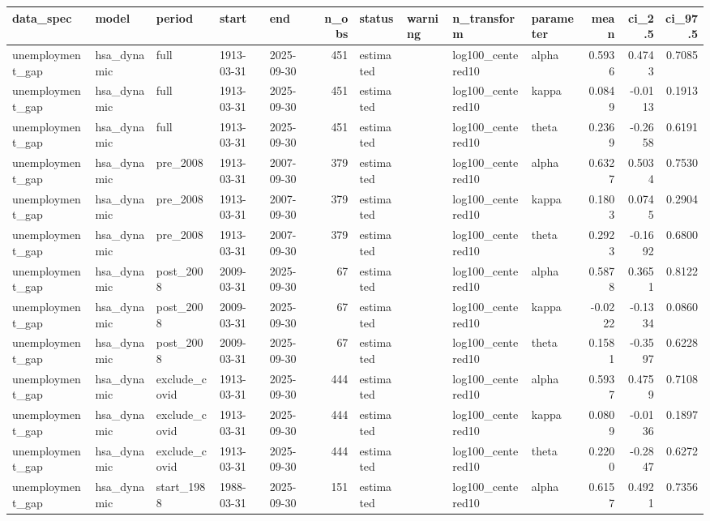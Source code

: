 \begin{tabular}{lllllrllllrrr}
\toprule
data\_spec & model & period & start & end & n\_obs & status & warning & n\_transform & parameter & mean & ci\_2.5 & ci\_97.5 \\
\midrule
unemployment\_gap & hsa\_dynamic & full & 1913-03-31 & 2025-09-30 & 451 & estimated &  & log100\_centered10 & alpha & 0.5936 & 0.4743 & 0.7085 \\
unemployment\_gap & hsa\_dynamic & full & 1913-03-31 & 2025-09-30 & 451 & estimated &  & log100\_centered10 & kappa & 0.0849 & -0.0113 & 0.1913 \\
unemployment\_gap & hsa\_dynamic & full & 1913-03-31 & 2025-09-30 & 451 & estimated &  & log100\_centered10 & theta & 0.2369 & -0.2658 & 0.6191 \\
unemployment\_gap & hsa\_dynamic & pre\_2008 & 1913-03-31 & 2007-09-30 & 379 & estimated &  & log100\_centered10 & alpha & 0.6327 & 0.5034 & 0.7530 \\
unemployment\_gap & hsa\_dynamic & pre\_2008 & 1913-03-31 & 2007-09-30 & 379 & estimated &  & log100\_centered10 & kappa & 0.1803 & 0.0745 & 0.2904 \\
unemployment\_gap & hsa\_dynamic & pre\_2008 & 1913-03-31 & 2007-09-30 & 379 & estimated &  & log100\_centered10 & theta & 0.2923 & -0.1692 & 0.6800 \\
unemployment\_gap & hsa\_dynamic & post\_2008 & 2009-03-31 & 2025-09-30 & 67 & estimated &  & log100\_centered10 & alpha & 0.5878 & 0.3651 & 0.8122 \\
unemployment\_gap & hsa\_dynamic & post\_2008 & 2009-03-31 & 2025-09-30 & 67 & estimated &  & log100\_centered10 & kappa & -0.0222 & -0.1334 & 0.0860 \\
unemployment\_gap & hsa\_dynamic & post\_2008 & 2009-03-31 & 2025-09-30 & 67 & estimated &  & log100\_centered10 & theta & 0.1581 & -0.3597 & 0.6228 \\
unemployment\_gap & hsa\_dynamic & exclude\_covid & 1913-03-31 & 2025-09-30 & 444 & estimated &  & log100\_centered10 & alpha & 0.5937 & 0.4759 & 0.7108 \\
unemployment\_gap & hsa\_dynamic & exclude\_covid & 1913-03-31 & 2025-09-30 & 444 & estimated &  & log100\_centered10 & kappa & 0.0809 & -0.0136 & 0.1897 \\
unemployment\_gap & hsa\_dynamic & exclude\_covid & 1913-03-31 & 2025-09-30 & 444 & estimated &  & log100\_centered10 & theta & 0.2200 & -0.2847 & 0.6272 \\
unemployment\_gap & hsa\_dynamic & start\_1988 & 1988-03-31 & 2025-09-30 & 151 & estimated &  & log100\_centered10 & alpha & 0.6157 & 0.4921 & 0.7356 \\

\end{tabular}
